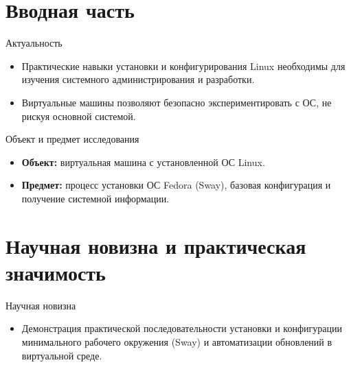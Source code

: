 \documentclass[
  ignorenonframetext,
  aspectratio=169,
  russian,
  aspectratio=169]{beamer}
\providecommand{\tightlist}{%
  \setlength{\itemsep}{0pt}\setlength{\parskip}{0pt}}
\begin{document}
\section{Вводная
часть}\label{ux432ux432ux43eux434ux43dux430ux44f-ux447ux430ux441ux442ux44c}

\begin{frame}{Актуальность}
\label{ux430ux43aux442ux443ux430ux43bux44cux43dux43eux441ux442ux44c}
\begin{itemize}[<+->]
\tightlist
\item
  Практические навыки установки и конфигурирования Linux необходимы для
  изучения системного администрирования и разработки.
\item
  Виртуальные машины позволяют безопасно экспериментировать с ОС, не
  рискуя основной системой.
\end{itemize}
\end{frame}

\begin{frame}{Объект и предмет исследования}
\label{ux43eux431ux44aux435ux43aux442-ux438-ux43fux440ux435ux434ux43cux435ux442-ux438ux441ux441ux43bux435ux434ux43eux432ux430ux43dux438ux44f}
\begin{itemize}[<+->]
\tightlist
\item
  \textbf{Объект:} виртуальная машина с установленной ОС Linux.
\item
  \textbf{Предмет:} процесс установки ОС Fedora (Sway), базовая
  конфигурация и получение системной информации.
\end{itemize}
\end{frame}

\section{Научная новизна и практическая
значимость}\label{ux43dux430ux443ux447ux43dux430ux44f-ux43dux43eux432ux438ux437ux43dux430-ux438-ux43fux440ux430ux43aux442ux438ux447ux435ux441ux43aux430ux44f-ux437ux43dux430ux447ux438ux43cux43eux441ux442ux44c}

\begin{frame}{Научная новизна}
\label{ux43dux430ux443ux447ux43dux430ux44f-ux43dux43eux432ux438ux437ux43dux430}
\begin{itemize}[<+->]
\tightlist
\item
  Демонстрация практической последовательности установки и конфигурации
  минимального рабочего окружения (Sway) и автоматизации обновлений в
  виртуальной среде.
\end{itemize}
\end{frame}
\end{document}
